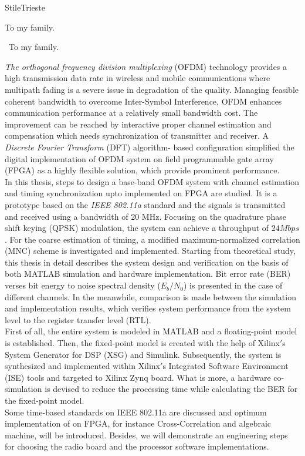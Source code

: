 \documentclass[12pt,oneside,cucitura]{toptesi}
\begin{document}
\english
{}

\expandafter\ifx\csname StileTrieste\endcsname\relax
    \frontespizio
\else
    \paginavuota
    \begin{dedica}
       To my family.

        \textdagger\ To my family.
    \end{dedica}
    \tomo
\fi

%
\cleardoublepage

\sommario
\textit{The orthogonal frequency division multiplexing} (OFDM) technology provides a high transmission data rate in wireless and mobile communications where multipath fading is a severe issue in degradation of the quality. Managing feasible coherent bandwidth to overcome Inter-Symbol Interference, OFDM enhances communication performance at a relatively small bandwidth cost. The improvement can be reached by interactive proper channel estimation and compensation which needs synchronization of transmitter and receiver. A \textit{Discrete Fourier Transform} (DFT) algorithm- based configuration simplified the digital implementation of OFDM system on field programmable gate array (FPGA) as a highly flexible solution, which provide prominent performance.\\
In this thesis, steps to design a base-band OFDM system with channel estimation and timing synchronization upto implemented on FPGA are studied. It is a prototype based on the \textit{IEEE 802.11a} standard and the signals is transmitted and received using a bandwidth of 20 MHz. Focusing on the quadrature phase shift keying (QPSK) modulation, the system can achieve a throughput of $24 Mbps$. For the coarse estimation of timing, a modified maximum-normalized correlation (MNC) scheme is investigated and implemented. Starting from theoretical study, this thesis in detail describes the system design and verification on the basis of both MATLAB simulation and hardware implementation. Bit error rate (BER) verses bit energy to noise spectral density ($E_{b}/N_{0}$) is presented in the case of different channels. In the meanwhile, comparison is made between the simulation and implementation results, which verifies system performance from the system level to the register transfer level (RTL).\\
First of all, the entire system is modeled in MATLAB and a floating-point model is established. Then, the fixed-point model is created with the help of Xilinx$'$s System Generator for DSP (XSG) and Simulink. Subsequently, the system is synthesized and implemented within Xilinx$'$s Integrated Software Environment (ISE) tools and targeted to Xilinx Zynq board. What is more, a hardware co-simulation is devised to reduce the processing time while calculating the BER for the fixed-point model.\\
Some time-based standards on IEEE 802.11a are discussed and optimum implementation of on FPGA, for instance Cross-Correlation and algebraic machine, will be introduced. Besides, we will demonstrate an engineering steps for choosing the radio board and the processor software implementations.\\
\end{document}
